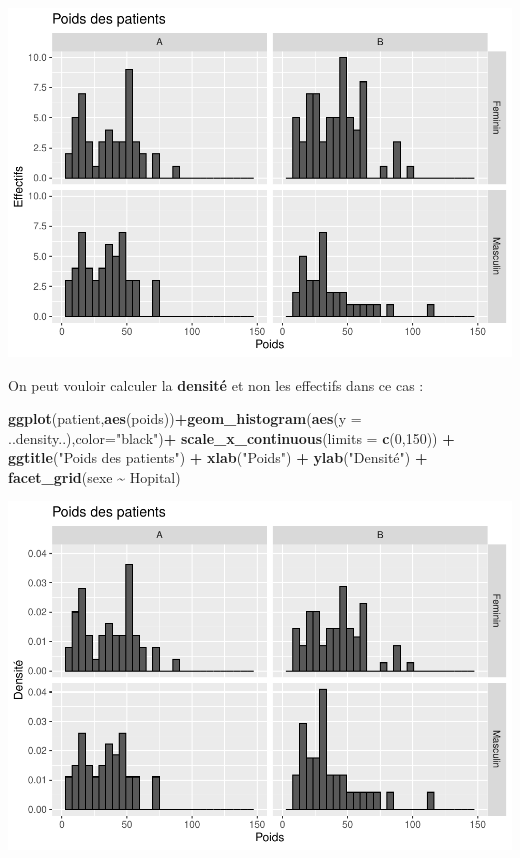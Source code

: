\documentclass[
]{book}
\newenvironment{Shaded}{\begin{snugshade}}{\end{snugshade}}
\newcommand{\AttributeTok}[1]{\textcolor[rgb]{0.13,0.29,0.53}{#1}}
\newcommand{\DecValTok}[1]{\textcolor[rgb]{0.00,0.00,0.81}{#1}}
\newcommand{\FunctionTok}[1]{\textcolor[rgb]{0.13,0.29,0.53}{\textbf{#1}}}
\newcommand{\NormalTok}[1]{#1}
\newcommand{\SpecialCharTok}[1]{\textcolor[rgb]{0.81,0.36,0.00}{\textbf{#1}}}
\newcommand{\StringTok}[1]{\textcolor[rgb]{0.31,0.60,0.02}{#1}}
\begin{document}
\includegraphics{_main_files/figure-latex/ggplot10-1.pdf}

On peut vouloir calculer la \textbf{densité} et non les effectifs dans ce cas :

\begin{Shaded}
\begin{Highlighting}[]
\FunctionTok{ggplot}\NormalTok{(patient,}\FunctionTok{aes}\NormalTok{(poids))}\SpecialCharTok{+}\FunctionTok{geom\_histogram}\NormalTok{(}\FunctionTok{aes}\NormalTok{(}\AttributeTok{y =}\NormalTok{ ..density..),}\AttributeTok{color=}\StringTok{"black"}\NormalTok{)}\SpecialCharTok{+}
  \FunctionTok{scale\_x\_continuous}\NormalTok{(}\AttributeTok{limits =} \FunctionTok{c}\NormalTok{(}\DecValTok{0}\NormalTok{,}\DecValTok{150}\NormalTok{)) }\SpecialCharTok{+} 
  \FunctionTok{ggtitle}\NormalTok{(}\StringTok{"Poids des patients"}\NormalTok{) }\SpecialCharTok{+} 
  \FunctionTok{xlab}\NormalTok{(}\StringTok{"Poids"}\NormalTok{) }\SpecialCharTok{+} 
  \FunctionTok{ylab}\NormalTok{(}\StringTok{"Densité"}\NormalTok{) }\SpecialCharTok{+}
  \FunctionTok{facet\_grid}\NormalTok{(sexe }\SpecialCharTok{\textasciitilde{}}\NormalTok{ Hopital)}
\end{Highlighting}
\end{Shaded}

\includegraphics{_main_files/figure-latex/ggplot11-1.pdf}
\end{document}
